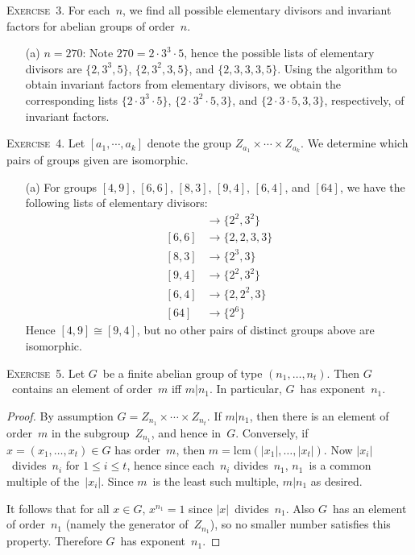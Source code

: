 \documentclass[letterpaper]{article}
\newcommand{\exercise}[1]{\goodbreak\noindent\textsc{Exercise~{#1}.}}
\newcommand{\iso}{\cong}
\newcommand{\ord}[1]{|{#1}|}
\begin{document}
\exercise{3}
For each~$n$, we find all possible  elementary divisors and invariant factors for abelian groups of order~$n$.
\begin{enumerate}[itemsep=0pt]
\item[(a)] $n=270$: Note $270=2\cdot 3^3\cdot 5$, hence the possible lists of elementary divisors are $\{2,3^3,5\}$, $\{2,3^2,3,5\}$, and $\{2,3,3,3,5\}$. Using the algorithm to obtain invariant factors from elementary divisors, we obtain the corresponding lists $\{2\cdot 3^3\cdot 5\}$, $\{2\cdot 3^2\cdot 5,3\}$, and $\{2\cdot 3\cdot 5,3,3\}$, respectively, of invariant factors.
\end{enumerate}

\exercise{4}
Let $[a_1,\cdots,a_k]$ denote the group $Z_{a_1}\times\cdots\times Z_{a_k}$. We determine which pairs of groups given are isomorphic.
\begin{enumerate}[itemsep=0pt]
\item[(a)] For groups $[4,9]$, $[6,6]$, $[8,3]$, $[9,4]$, $[6,4]$, and $[64]$, we have the following lists of elementary divisors:
\begin{align*}
[4,9]&\longrightarrow\{2^2,3^2\}\\
[6,6]&\longrightarrow\{2,2,3,3\}\\
[8,3]&\longrightarrow\{2^3,3\}\\
[9,4]&\longrightarrow\{2^2,3^2\}\\
[6,4]&\longrightarrow\{2,2^2,3\}\\
[64]&\longrightarrow\{2^6\}
\end{align*}
Hence $[4,9]\iso[9,4]$, but no other pairs of distinct groups above are isomorphic.

\end{enumerate}

\exercise{5}
Let $G$~be a finite abelian group of type $(n_1,\ldots,n_t)$. Then $G$~contains an element of order~$m$ iff $m|n_1$. In particular, $G$~has exponent~$n_1$.
\begin{proof}
By assumption $G=Z_{n_1}\times\cdots\times Z_{n_t}$. If $m|n_1$, then there is an element of order~$m$ in the subgroup~$Z_{n_1}$, and hence in~$G$. Conversely, if $x=(x_1,\ldots,x_t)\in G$ has order~$m$, then $m=\mathrm{lcm}(\ord{x_1},\ldots,\ord{x_t})$. Now $\ord{x_i}$~divides~$n_i$ for $1\le i\le t$, hence since each~$n_i$ divides~$n_1$, $n_1$~is a common multiple of the~$\ord{x_i}$. Since $m$~is the least such multiple, $m|n_1$ as desired.

It follows that for all $x\in G$, $x^{n_1}=1$ since $\ord{x}$~divides~$n_1$. Also $G$~has an element of order~$n_1$ (namely the generator of~$Z_{n_1}$), so no smaller number satisfies this property. Therefore $G$~has exponent~$n_1$.
\end{proof}
\end{document}
